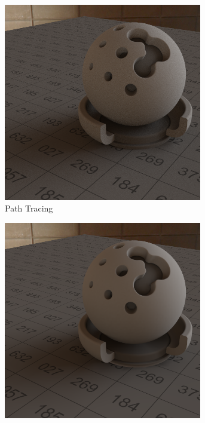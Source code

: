 		\begin{figure}[h]
			\begin{subfigure}[t]{0.245\textwidth}
				\center
				\includegraphics[width=0.95\textwidth]{pic/irrmap-shaderball_e-ref.png}
				\caption{Path Tracing}
			\end{subfigure}
			\begin{subfigure}[t]{0.245\textwidth}
				\center
				\includegraphics[width=0.95\textwidth]{pic/irrmap-shaderball_e-vmap.png}

\end{subfigure}
\end{figure}
